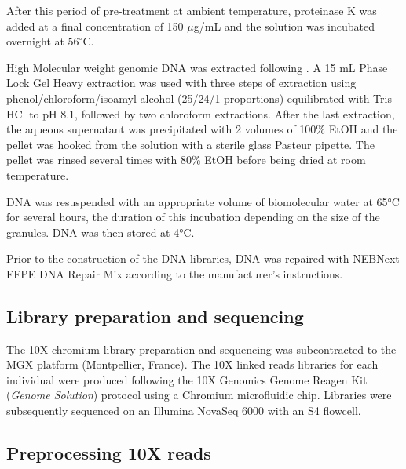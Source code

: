 \documentclass[11pt, a4paper]{article}
\begin{document}
After this period of pre-treatment at ambient temperature, proteinase K was added at a final concentration of 150 \(\mu\)g/mL and the solution was incubated overnight at $56^\circ$C.

High Molecular weight genomic DNA was extracted following \textcite{Nakayama1994}.
A 15 mL Phase Lock Gel Heavy extraction was used with three steps of extraction using phenol/chloroform/isoamyl alcohol (25/24/1 proportions) equilibrated with Tris-HCl to pH 8.1, followed by two chloroform extractions.
After the last extraction, the aqueous supernatant was precipitated with 2 volumes of 100\% EtOH and the pellet was hooked from the solution with a sterile glass Pasteur pipette.
The pellet was rinsed several times with 80\% EtOH before being dried at room temperature.

DNA was resuspended with an appropriate volume of biomolecular water at 65°C for several hours, the duration of this incubation depending on the size of the granules.
DNA was then stored at 4°C.

Prior to the construction of the DNA libraries, DNA was repaired with NEBNext FFPE DNA Repair Mix according to the manufacturer's instructions.

\subsection{Library preparation and sequencing}

The 10X chromium library preparation and sequencing was subcontracted to the MGX platform (Montpellier, France).
The 10X linked reads libraries for each individual were produced following the 10X Genomics Genome Reagen Kit (\emph{Genome Solution}) protocol using a Chromium microfluidic chip.
Libraries were subsequently sequenced on an Illumina NovaSeq 6000 with an S4 flowcell.

\subsection{Preprocessing 10X reads}\label{preproc}
\end{document}
